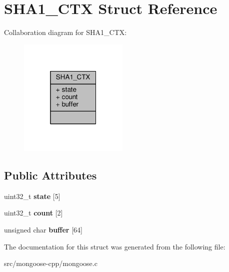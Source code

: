 \hypertarget{structSHA1__CTX}{}\section{S\+H\+A1\+\_\+\+C\+TX Struct Reference}
\label{structSHA1__CTX}


Collaboration diagram for S\+H\+A1\+\_\+\+C\+TX\+:
\nopagebreak
\begin{figure}[H]
\begin{center}
\leavevmode
\includegraphics[width=148pt]{d3/db4/structSHA1__CTX__coll__graph}
\end{center}
\end{figure}
\subsection*{Public Attributes}
\begin{DoxyCompactItemize}
\item 
uint32\+\_\+t {\bfseries state} \mbox{[}5\mbox{]}\hypertarget{structSHA1__CTX_a81d7f6018258ee84f001284c6ff9d2d5}{}\label{structSHA1__CTX_a81d7f6018258ee84f001284c6ff9d2d5}

\item 
uint32\+\_\+t {\bfseries count} \mbox{[}2\mbox{]}\hypertarget{structSHA1__CTX_a7db1dac8c2309a5b22f1cf4bc5de96a5}{}\label{structSHA1__CTX_a7db1dac8c2309a5b22f1cf4bc5de96a5}

\item 
unsigned char {\bfseries buffer} \mbox{[}64\mbox{]}\hypertarget{structSHA1__CTX_a90100b1aab0fedb1d72ded66abeeffe2}{}\label{structSHA1__CTX_a90100b1aab0fedb1d72ded66abeeffe2}

\end{DoxyCompactItemize}


The documentation for this struct was generated from the following file\+:\begin{DoxyCompactItemize}
\item 
src/mongoose-\/cpp/mongoose.\+c\end{DoxyCompactItemize}
